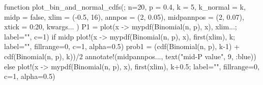 \documentclass[
  letterpaper,
  DIV=11,
  numbers=noendperiod]{scrartcl}
\newenvironment{Shaded}{\begin{snugshade}}{\end{snugshade}}
\newcommand{\ConstantTok}[1]{\textcolor[rgb]{0.56,0.35,0.01}{#1}}
\newcommand{\ControlFlowTok}[1]{\textcolor[rgb]{0.00,0.23,0.31}{#1}}
\newcommand{\FloatTok}[1]{\textcolor[rgb]{0.68,0.00,0.00}{#1}}
\newcommand{\FunctionTok}[1]{\textcolor[rgb]{0.28,0.35,0.67}{#1}}
\newcommand{\KeywordTok}[1]{\textcolor[rgb]{0.00,0.23,0.31}{#1}}
\newcommand{\NormalTok}[1]{\textcolor[rgb]{0.00,0.23,0.31}{#1}}
\newcommand{\OperatorTok}[1]{\textcolor[rgb]{0.37,0.37,0.37}{#1}}
\newcommand{\StringTok}[1]{\textcolor[rgb]{0.13,0.47,0.30}{#1}}
\begin{document}
\begin{Shaded}
\begin{Highlighting}[]
\KeywordTok{function} \FunctionTok{plot\_bin\_and\_normal\_cdfs}\NormalTok{(;}
\NormalTok{        n}\OperatorTok{=}\FloatTok{20}\NormalTok{, p }\OperatorTok{=} \FloatTok{0.4}\NormalTok{, k }\OperatorTok{=} \FloatTok{5}\NormalTok{, k\_normal }\OperatorTok{=}\NormalTok{ k, midp }\OperatorTok{=} \ConstantTok{false}\NormalTok{, }
\NormalTok{        xlim }\OperatorTok{=}\NormalTok{ (}\OperatorTok{{-}}\FloatTok{0.5}\NormalTok{, }\FloatTok{16}\NormalTok{), annpos }\OperatorTok{=}\NormalTok{ (}\FloatTok{2}\NormalTok{, }\FloatTok{0.05}\NormalTok{), midpannpos }\OperatorTok{=}\NormalTok{ (}\FloatTok{2}\NormalTok{, }\FloatTok{0.07}\NormalTok{),}
\NormalTok{        xtick }\OperatorTok{=} \FloatTok{0}\OperatorTok{:}\FloatTok{20}\NormalTok{, kwargs}\OperatorTok{...}
\NormalTok{    )}
\NormalTok{    P1 }\OperatorTok{=} \FunctionTok{plot}\NormalTok{(x }\OperatorTok{{-}\textgreater{}} \FunctionTok{mypdf}\NormalTok{(}\FunctionTok{Binomial}\NormalTok{(n, p), x), xlim}\OperatorTok{...}\NormalTok{; label}\OperatorTok{=}\StringTok{""}\NormalTok{, c}\OperatorTok{=}\FloatTok{1}\NormalTok{)}
    \ControlFlowTok{if}\NormalTok{ midp}
        \FunctionTok{plot!}\NormalTok{(x }\OperatorTok{{-}\textgreater{}} \FunctionTok{mypdf}\NormalTok{(}\FunctionTok{Binomial}\NormalTok{(n, p), x), }\FunctionTok{first}\NormalTok{(xlim), k;}
\NormalTok{                label}\OperatorTok{=}\StringTok{""}\NormalTok{, fillrange}\OperatorTok{=}\FloatTok{0}\NormalTok{, c}\OperatorTok{=}\FloatTok{1}\NormalTok{, alpha}\OperatorTok{=}\FloatTok{0.5}\NormalTok{)}
\NormalTok{        prob1 }\OperatorTok{=}\NormalTok{ (}\FunctionTok{cdf}\NormalTok{(}\FunctionTok{Binomial}\NormalTok{(n, p), k}\OperatorTok{{-}}\FloatTok{1}\NormalTok{) }\OperatorTok{+} \FunctionTok{cdf}\NormalTok{(}\FunctionTok{Binomial}\NormalTok{(n, p), k))}\OperatorTok{/}\FloatTok{2}
        \FunctionTok{annotate!}\NormalTok{(midpannpos}\OperatorTok{...}\NormalTok{, }\FunctionTok{text}\NormalTok{(}\StringTok{"mid{-}P value"}\NormalTok{, }\FloatTok{9}\NormalTok{, }\OperatorTok{:}\NormalTok{blue))}
    \ControlFlowTok{else}
        \FunctionTok{plot!}\NormalTok{(x }\OperatorTok{{-}\textgreater{}} \FunctionTok{mypdf}\NormalTok{(}\FunctionTok{Binomial}\NormalTok{(n, p), x), }\FunctionTok{first}\NormalTok{(xlim), k}\OperatorTok{+}\FloatTok{0.5}\NormalTok{;}
\NormalTok{                label}\OperatorTok{=}\StringTok{""}\NormalTok{, fillrange}\OperatorTok{=}\FloatTok{0}\NormalTok{, c}\OperatorTok{=}\FloatTok{1}\NormalTok{, alpha}\OperatorTok{=}\FloatTok{0.5}\NormalTok{)}

\end{Highlighting}
\end{Shaded}
\end{document}
